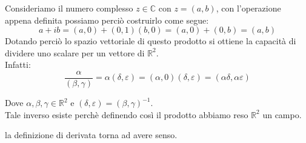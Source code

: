 \documentclass{article}
\begin{document}
    Consideriamo il numero complesso $z \in \mathbb{C}$ con $z = (a,b)$, con l'operazione appena definita possiamo perciò costruirlo come segue:
    \begin{equation*}
        a + ib = (a,0) + (0,1)(b,0) = (a, 0) + (0,b) = (a,b) 
    \end{equation*}
        Dotando perciò lo spazio vettoriale di questo prodotto si ottiene la capacità di dividere uno scalare per un vettore di $\mathbb{R}^2$. \\
        Infatti: 
        \begin{equation*}
            \frac{\alpha }{(\beta ,\gamma)} = \alpha (\delta ,\varepsilon) = (\alpha, 0)(\delta ,\varepsilon) = (\alpha \delta, \alpha \varepsilon )
        \end{equation*}

        Dove $\alpha,\beta,\gamma \in \mathbb{R}^2$ e $(\delta ,\varepsilon) = (\beta, \gamma)^{-1}$. \\
        Tale inverso esiste perchè definendo così il prodotto abbiamo reso $\mathbb{R}^2$ un campo.

        la definizione di derivata torna ad avere senso.
\end{document}
